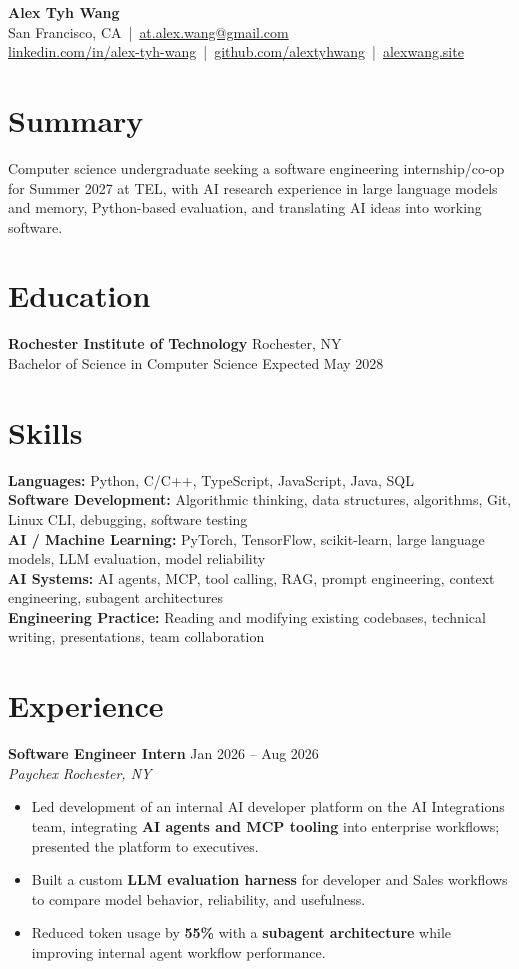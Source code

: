 \documentclass[10pt,letterpaper]{article}
\newif\ifresumeFirstRole
\newcommand{\resumeRole}[4]{%
  \ifresumeFirstRole
    \global\resumeFirstRolefalse
  \else
    \vspace{0pt plus 1fill}%
  \fi
  \textbf{#1} \hfill #2\\
  \textit{#3} \hfill \textit{#4}
}
\begin{document}
\begin{center}
{\Large \textbf{Alex Tyh Wang}}\\
San Francisco, CA \,|\, \href{mailto:at.alex.wang@gmail.com}{at.alex.wang@gmail.com}\\
\small \href{https://www.linkedin.com/in/alex-tyh-wang/}{linkedin.com/in/alex-tyh-wang} \,|\, \href{https://github.com/alextyhwang}{github.com/alextyhwang} \,|\, \href{https://alexwang.site}{alexwang.site}
\end{center}

\section*{Summary}
Computer science undergraduate seeking a software engineering internship/co-op for Summer 2027 at TEL, with AI research experience in large language models and memory, Python-based evaluation, and translating AI ideas into working software.

\section*{Education}
\textbf{Rochester Institute of Technology} \hfill Rochester, NY\\
Bachelor of Science in Computer Science \hfill Expected May 2028

\section*{Skills}
\textbf{Languages:} Python, C/C++, TypeScript, JavaScript, Java, SQL\\
\textbf{Software Development:} Algorithmic thinking, data structures, algorithms, Git, Linux CLI, debugging, software testing\\
\textbf{AI / Machine Learning:} PyTorch, TensorFlow, scikit-learn, large language models, LLM evaluation, model reliability\\
\textbf{AI Systems:} AI agents, MCP, tool calling, RAG, prompt engineering, context engineering, subagent architectures\\
\textbf{Engineering Practice:} Reading and modifying existing codebases, technical writing, presentations, team collaboration

\section*{Experience}
\resumeRole{Software Engineer Intern}{Jan 2026 -- Aug 2026}{Paychex}{Rochester, NY}
\begin{itemize}
  \item Led development of an internal AI developer platform on the AI Integrations team, integrating \textbf{AI agents and MCP tooling} into enterprise workflows; presented the platform to executives.
  \item Built a custom \textbf{LLM evaluation harness} for developer and Sales workflows to compare model behavior, reliability, and usefulness.
  \item Reduced token usage by \textbf{55\%} with a \textbf{subagent architecture} while improving internal agent workflow performance.
\end{itemize}
\end{document}
